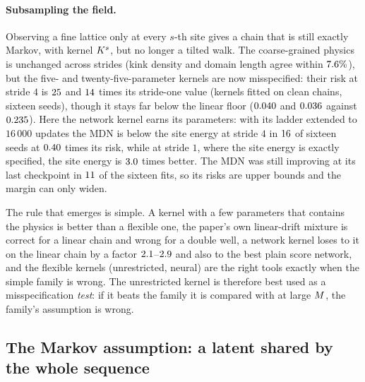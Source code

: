 \paragraph{Subsampling the field.}
Observing a fine lattice only at every $s$-th site gives a chain that is still exactly Markov, with kernel $K^s$,
but no longer a tilted walk. The coarse-grained physics is unchanged across strides
(kink density and domain length agree within $7.6\%$), but the five- and twenty-five-parameter
kernels are now misspecified: their risk at stride $4$ is $25$ and $14$ times its
stride-one value (kernels fitted on clean chains, sixteen seeds), though it stays far below the linear floor
($0.040$ and $0.036$ against $0.235$). Here the network kernel earns its parameters:
with its ladder extended to $16\,000$ updates the MDN is below the site energy at stride $4$ in $16$ of sixteen seeds
at $0.40$ times its risk, while at stride $1$, where the site energy is exactly specified, the site energy is
$3.0$ times better. The MDN was still improving at its last checkpoint in $11$ of the
sixteen fits, so its risks are upper bounds and the margin can only widen.

The rule that emerges is simple. A kernel with a few parameters that contains the physics is better than a flexible one,
the paper's own linear-drift mixture is correct for a linear chain and wrong for a double well, a network kernel loses to it
on the linear chain by a factor $2.1$--$2.9$ and also to the best plain score network, and the flexible
kernels (unrestricted, neural) are the right tools exactly when the simple family is wrong. The unrestricted kernel is therefore
best used as a misspecification \emph{test}: if it beats the family it is compared with at large $M$, the family's
assumption is wrong.

\subsection{The Markov assumption: a latent shared by the whole sequence}
\label{sec:latent}

